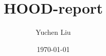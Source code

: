 \documentclass{beamer}
\title{HOOD-report}
\author{Yuchen Liu}
\date{\today}
\begin{document}
\frame{\titlepage}
\end{document}
